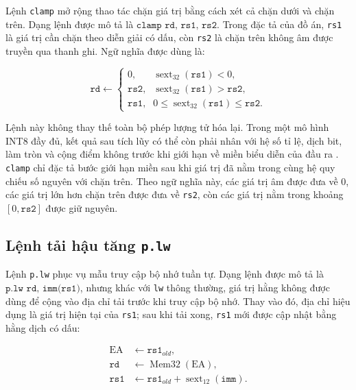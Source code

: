 \documentclass[../DoAn.tex]{subfiles}
\begin{document}
Lệnh \texttt{clamp} mở rộng thao tác chặn giá trị bằng cách xét cả chặn dưới và chặn trên. Dạng lệnh được mô tả là \(\texttt{clamp rd, rs1, rs2}\). Trong đặc tả của đồ án, \texttt{rs1} là giá trị cần chặn theo diễn giải có dấu, còn \texttt{rs2} là chặn trên không âm được truyền qua thanh ghi. Ngữ nghĩa được dùng là:

\begin{equation}
    \texttt{rd} \leftarrow
    \begin{cases}
        0, & \operatorname{sext}_{32}(\texttt{rs1}) < 0, \\
        \texttt{rs2}, & \operatorname{sext}_{32}(\texttt{rs1}) > \texttt{rs2}, \\
        \texttt{rs1}, & 0 \le \operatorname{sext}_{32}(\texttt{rs1}) \le \texttt{rs2}.
    \end{cases}
    \label{eq:clamp-semantics}
\end{equation}

Lệnh này không thay thế toàn bộ phép lượng tử hóa lại. Trong một mô hình INT8 đầy đủ, kết quả sau tích lũy có thể còn phải nhân với hệ số tỉ lệ, dịch bit, làm tròn và cộng điểm không trước khi giới hạn về miền biểu diễn của đầu ra \cite{google_litert_quant_spec}. \texttt{clamp} chỉ đặc tả bước giới hạn miền sau khi giá trị đã nằm trong cùng hệ quy chiếu số nguyên với chặn trên. Theo ngữ nghĩa này, các giá trị âm được đưa về 0, các giá trị lớn hơn chặn trên được đưa về \texttt{rs2}, còn các giá trị nằm trong khoảng \([0, \texttt{rs2}]\) được giữ nguyên.

\subsection{Lệnh tải hậu tăng \texttt{p.lw}}
\label{subsec:dac-ta-p-lw}

Lệnh \texttt{p.lw} phục vụ mẫu truy cập bộ nhớ tuần tự. Dạng lệnh được mô tả là \(\texttt{p.lw rd, imm(rs1)}\), nhưng khác với \texttt{lw} thông thường, giá trị hằng không được dùng để cộng vào địa chỉ tải trước khi truy cập bộ nhớ. Thay vào đó, địa chỉ hiệu dụng là giá trị hiện tại của \texttt{rs1}; sau khi tải xong, \texttt{rs1} mới được cập nhật bằng hằng dịch có dấu:

\begin{equation}
    \begin{aligned}
        \mathrm{EA} &\leftarrow \texttt{rs1}_{old}, \\
        \texttt{rd} &\leftarrow \operatorname{Mem32}(\mathrm{EA}), \\
        \texttt{rs1} &\leftarrow \texttt{rs1}_{old} + \operatorname{sext}_{12}(\texttt{imm}).
    \end{aligned}
    \label{eq:plw-semantics}
\end{equation}
\end{document}
